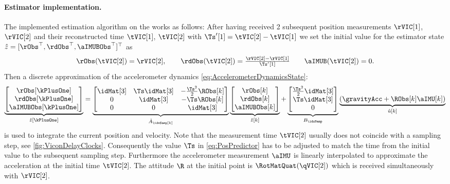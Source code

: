\paragraph{Estimator implementation.}
The implemented estimation algorithm on the \microcontroller works as follows:
After having received 2 subsequent position measurements $\rVIC[1]$, $\rVIC[2]$ and their reconstructed time $\tVIC[1]$, $\tVIC[2]$ with $\Ts'[1]=\tVIC[2]-\tVIC[1]$ we set the initial value for the estimator state $\hat{z} = [\rObs^\top, \rdObs^\top, \aIMUBObs^\top]^\top$ as
\begin{align}
 \rObs(\tVIC[2]) = \rVIC[2], 
\qquad
 \rdObs(\tVIC[2]) = \tfrac{\rVIC[2]-\rVIC[1]}{\Ts'[1]}
\qquad
 \aIMUB(\tVIC[2]) = 0.
\end{align}
Then a discrete approximation of the accelerometer dynamics \eqref{eq:AccelerometerDynamicsState}:
\begin{align}\label{eq:PosPredictor}
 \underbrace{\begin{bmatrix} \rObs[\kPlusOne] \\ \rdObs[\kPlusOne] \\ \aIMUBObs[\kPlusOne] \end{bmatrix}}_{\hat{z}[\kPlusOne]}
 =
 \underbrace{\begin{bmatrix} \idMat[3] & \Ts\idMat[3] & -\tfrac{\Ts^2}{2}\RObs[k] \\ 0 & \idMat[3] & -\Ts\RObs[k] \\ 0 & 0 & \idMat[3] \end{bmatrix}}_{\hat{A}_\idxSamp[k]}
 \underbrace{\begin{bmatrix} \rObs[k] \\ \rdObs[k] \\ \aIMUBObs[k] \end{bmatrix}}_{\hat{z}[k]}
 +
 \underbrace{\begin{bmatrix} \tfrac{\Ts^2}{2}\idMat[3] \\ \Ts \idMat[3] \\ 0 \end{bmatrix}}_{B_\idxSamp}
 \underbrace{(\gravityAcc + \RObs[k] \aIMU[k])}_{\hat{u}[k]}
\end{align}
is used to integrate the current position and velocity.
Note that the measurement time $\tVIC[2]$ usually does not coincide with a sampling step, see \autoref{fig:ViconDelayClocks}.
Consequently the value $\Ts$ in \eqref{eq:PosPredictor} has to be adjusted to match the time from the initial value to the subsequent sampling step.
Furthermore the accelerometer measurement $\aIMU$ is linearly interpolated to approximate the acceleration at the initial time $\tVIC[2]$.
The attitude $\R$ at the initial point is $\RotMatQuat(\qVIC[2])$ which is received simultaneously with $\rVIC[2]$.

